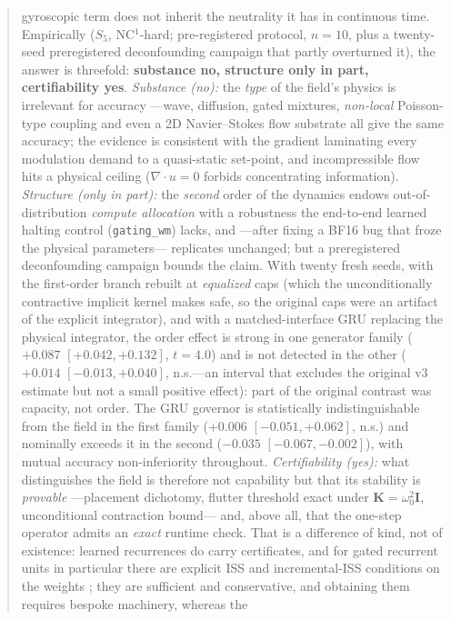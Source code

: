 \documentclass{article}
\begin{document}
\begin{abstract}
gyroscopic term does not inherit the neutrality it has in continuous time.
Empirically ($S_5$, NC$^1$-hard; pre-registered protocol, $n{=}10$, plus a
twenty-seed preregistered deconfounding campaign that partly overturned it),
the answer is threefold:
\textbf{substance no, structure only in part, certifiability yes}.
\emph{Substance (no):} the \emph{type} of the field's physics is
irrelevant for accuracy ---wave, diffusion, gated mixtures, \emph{non-local}
Poisson-type coupling and even a 2D Navier--Stokes flow substrate all give the
same accuracy; the evidence is consistent with the gradient laminating
every modulation demand to a quasi-static set-point, and incompressible
flow hits a physical ceiling
($\nabla\!\cdot u{=}0$ forbids concentrating information). \emph{Structure
(only in part):} the \emph{second} order of the dynamics endows
out-of-distribution \emph{compute allocation} with a robustness the
end-to-end learned halting control (\texttt{gating\_wm}) lacks, and ---after fixing a BF16 bug that froze the physical
parameters--- replicates unchanged; but a preregistered deconfounding
campaign bounds the claim. With twenty fresh seeds, with the first-order
branch rebuilt at \emph{equalized} caps (which the unconditionally
contractive implicit kernel makes safe, so the original caps were an
artifact of the explicit integrator), and with a matched-interface GRU
replacing the physical integrator, the order effect is strong in one
generator family ($+0.087$ $[+0.042,+0.132]$, $t{=}4.0$) and is not detected in
the other ($+0.014$ $[-0.013,+0.040]$, n.s.---an interval that excludes the
original v3 estimate but not a small positive effect): part of the original
contrast was capacity, not order. The GRU governor is statistically
indistinguishable from the field in the first family
($+0.006$ $[-0.051,+0.062]$, n.s.) and nominally exceeds it in the second ($-0.035$
$[-0.067,-0.002]$), with mutual accuracy non-inferiority throughout.
\emph{Certifiability (yes):} what distinguishes the field is therefore not
capability but that its stability is \emph{provable} ---placement
dichotomy, flutter threshold exact under $\mathbf{K}{=}\omega_0^2\mathbf{I}$,
unconditional contraction bound--- and, above all, that the one-step
operator admits an \emph{exact} runtime check. That is a difference of kind,
not of existence: learned recurrences do carry certificates, and for gated
recurrent units in particular there are explicit ISS and incremental-ISS
conditions on the weights \citep{bonassi2021stability}; they are sufficient
and conservative, and obtaining them requires bespoke machinery, whereas the

\end{abstract}
\end{document}
